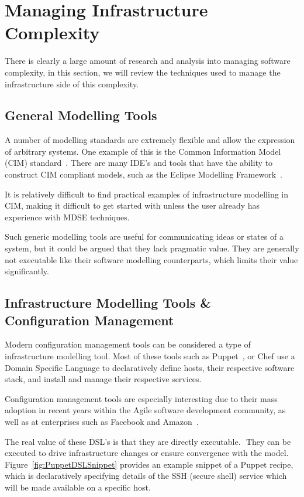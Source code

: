 \documentclass{cshonours}
\begin{document}
\pagebreak
\section{Managing Infrastructure Complexity}

There is clearly a large amount of research and analysis into managing software complexity, in this section, we will review the techniques used to manage the infrastructure side of this complexity.

\subsection{General Modelling Tools}

A number of modelling standards are extremely flexible and allow the expression of arbitrary systems. One example of this is the Common Information Model (CIM) standard~\cite{CIM}. There are many IDE’s and tools that have the ability to construct CIM compliant models, such as the Eclipse Modelling Framework~\cite{EMF}.

It is relatively difficult to find practical examples of infrastructure modelling in CIM, making it difficult to get started with unless the user already has experience with MDSE techniques.

Such generic modelling tools are useful for communicating ideas or states of a system, but it could be argued that they lack pragmatic value. They are generally not  executable like their software modelling counterparts, which limits their value significantly.

\subsection{Infrastructure Modelling Tools \& Configuration Management}

Modern configuration management tools can be considered a type of infrastructure modelling tool. Most of these tools such as Puppet~\cite{Puppet}, or Chef\cite{Chef} use a Domain Specific Language to declaratively define hosts, their respective software stack, and install and manage their respective services.

Configuration management tools are especially interesting due to their mass adoption in recent years within the Agile software development community, as well as at enterprises such as Facebook and Amazon~\cite{Chef}.

The real value of these DSL's is that they are directly executable.  They can be executed to drive infrastructure changes or ensure convergence with the model. Figure~\ref{fig:PuppetDSLSnippet} provides an example snippet of a Puppet recipe, which is declaratively specifying details of the SSH (secure shell) service which will be made available on a specific host.
\end{document}
